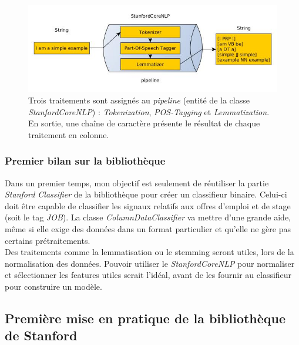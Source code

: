             \begin{figure}[h!]
                \centering
                \includegraphics[width=\textwidth]{images/coreNLP.jpg}
                \caption{Trois traitements sont assignés au \textit{pipeline} (entité de la classe \textit{StanfordCoreNLP}) : \textit{Tokenization}, \textit{POS-Tagging} et \textit{Lemmatization}. En sortie, une chaîne de caractère présente le résultat de chaque traitement en colonne.}
                \label{fig:coreNLP}
            \end{figure}

            \subsubsection{Premier bilan sur la bibliothèque}
                Dans un premier temps, mon objectif est seulement de réutiliser la partie \textit{Stanford Classifier} de la bibliothèque pour créer un classifieur binaire. Celui-ci doit être capable de classifier les signaux relatifs aux offres d'emploi et de stage (soit le tag \textit{JOB}). La classe \textit{ColumnDataClassifier} va mettre d'une grande aide, même si elle exige des données dans un format particulier et qu'elle ne gère pas certains prétraitements.\\

                Des traitements comme la lemmatisation ou le stemming seront utiles, lors de la normalisation des données. Pouvoir utiliser le \textit{StanfordCoreNLP} pour normaliser et sélectionner les features utiles serait l'idéal, avant de les fournir au classifieur pour construire un modèle.

        \subsection{Première mise en pratique de la bibliothèque de Stanford}
        \label{ssec:premiere_mise_en_appli}
